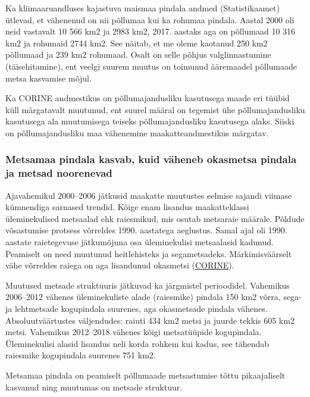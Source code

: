 \documentclass[estonian,]{article}
\begin{document}
Ka kliimaaruandluses kajastuva maismaa pindala andmed (Statistikaamet) ütlevad, et vähenenud on nii põllumaa kui ka rohumaa pindala. Aastal 2000 oli neid vastavalt 10 566 km2 ja 2983 km2, 2017. aastaks aga on põllumaad 10 316 km2 ja rohumaid 2744 km2. See näitab, et me oleme kaotanud 250 km2 põllumaad ja 239 km2 rohumaad. Osalt on selle põhjus valglinnastumine (täisehitamine), ent veelgi suurem muutus on toimunud ääremaadel põllumaade metsa kasvamise mõjul.

Ka CORINE andmestikus on põllumajandusliku kasutusega maade eri tüübid küll märgatavalt muutunud, ent suurel määral on tegemist ühe põllumajandusliku kasutusega ala muutumisega teiseks põllumajandusliku kasutusega alaks. Siiski on põllumajandusliku maa vähenemine maakatteandmestikus märgatav.

\hypertarget{metsamaa-pindala-kasvab-kuid-vuxe4heneb-okasmetsa-pindala-ja-metsad-noorenevad}{%
\subsubsection*{Metsamaa pindala kasvab, kuid väheneb okasmetsa pindala ja metsad noorenevad}\label{metsamaa-pindala-kasvab-kuid-vuxe4heneb-okasmetsa-pindala-ja-metsad-noorenevad}}

Ajavahemikul 2000--2006 jätkusid maakatte muutustes eelmise sajandi viimase kümnendiga sarnased trendid. Kõige enam lisandus maakatteklassi üleminekulised metsaalad ehk raiesmikud, mis osutab metsaraie määrale. Põldude võsastumise protsess võrreldes 1990. aastatega aeglustus. Samal ajal oli 1990. aastate raietegevuse jätkumõjuna osa üleminekulisi metsaalasid kadunud. Peamiselt on need muutunud heitlehisteks ja segametsadeks. Märkimisväärselt vähe võrreldes raiega on aga lisandunud okasmetsi (\protect\hyperlink{CORINE}{CORINE}).

Muutused metsade struktuuris jätkuvad ka järgmistel perioodidel. Vahemikus 2006--2012 vähenes üleminekuliste alade (raiesmike) pindala 150 km2 võrra, sega- ja lehtmetsade kogupindala suurenes, aga okasmetsade pindala vähenes. Absoluutväärtustes väljendudes: raiuti 434 km2 metsi ja juurde tekkis 605 km2 metsi. Vahemikus 2012--2018 vähenes kõigi metsatüüpide kogupindala. Üleminekulisi alasid lisandus neli korda rohkem kui kadus, see tähendab raiesmike kogupindala suurenes 751 km2.

\begin{blockquote-right}
Metsamaa pindala on peamiselt põllumaade metsastumise tõttu
pikaajaliselt kasvanud ning muutumas on metsade struktuur.
\end{blockquote-right}
\end{document}
